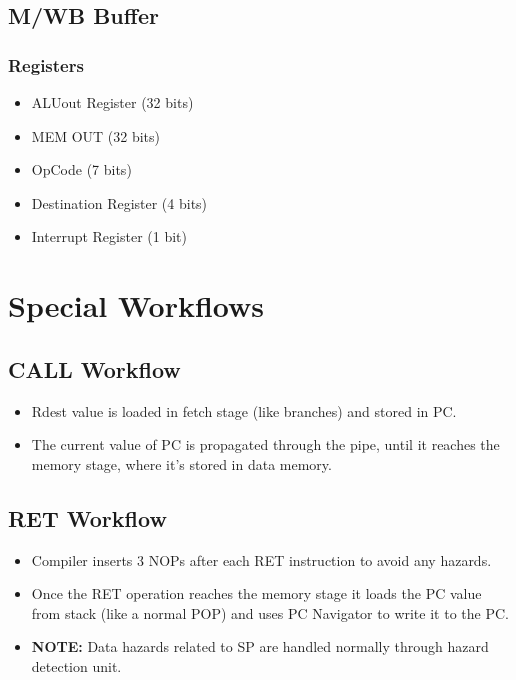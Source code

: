 \subsection{M/WB Buffer}

\subsubsection{Registers}
\begin{itemize}
    \item ALUout Register (32 bits)
    \item MEM OUT (32 bits)
    \item OpCode (7 bits)
    \item Destination Register (4 bits)
    \item Interrupt Register (1 bit)
\end{itemize}


\section{Special Workflows}

\subsection{CALL Workflow}
\begin{itemize}
    \item Rdest value is loaded in fetch stage (like branches) and stored in PC.
    \item The current value of PC is propagated through the pipe, until it reaches the memory stage, where it's stored in data memory.
\end{itemize}

\subsection{RET Workflow}
\begin{itemize}
    \item Compiler inserts 3 NOPs after each RET instruction to avoid any hazards.
    \item Once the RET operation reaches the memory stage it loads the PC value from stack (like a normal POP) and uses PC Navigator to write it to the PC.
    \item \textbf{NOTE:} Data hazards related to SP are handled normally through hazard detection unit.
\end{itemize}

